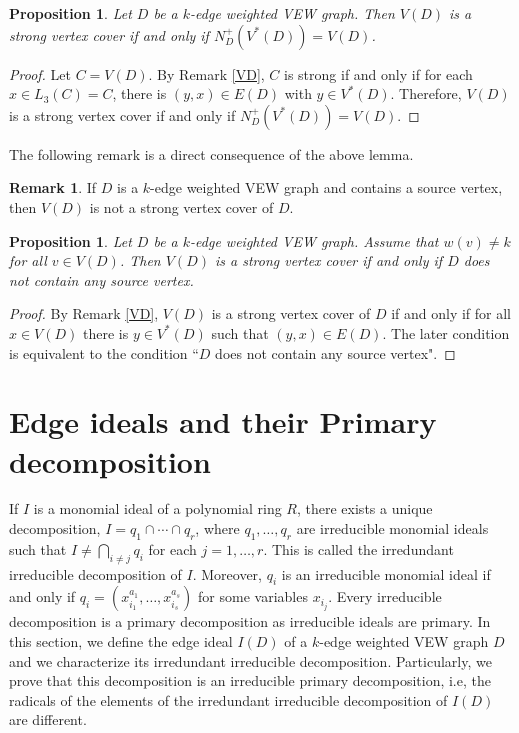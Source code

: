 \documentclass[11pt,reqno]{amsart}
\newtheorem{proposition}[theorem]{Proposition}
\theoremstyle{definition}
\newtheorem{remark}[theorem]{Remark}
\begin{document}
\begin{proposition}
	Let $ D $ be a $k$-edge weighted VEW graph. 
	Then $ V (D) $ is a strong vertex cover if
	and only if $ N_D^+(V^{*}(D)) = V(D) $. 	
\end{proposition}
\begin{proof}
	Let $ C = V (D). $ By Remark \ref{VD}, $ C $ is 
	strong  if and only if for each $ x \in L_3(C) = C $, there is $ (y,x) \in E(D) $ with $ y \in  V^{*}(D)$. Therefore, $ V (D) $ is a strong vertex
	cover if and only if $ N_D^+(V^{*}(D)) = V(D) $. 
\end{proof}


The following remark is a direct consequence of the above lemma.
\begin{remark}
If $ D $ is a $k$-edge weighted VEW graph  and contains a source vertex, then $ V (D) $    is not a strong vertex cover of $ D. $	
\end{remark}


\begin{proposition}
	Let $ D $ be a $k$-edge weighted VEW graph. Assume that
	$ w(v) \neq k $  for all $ v \in V(D) $.	Then $ V (D) $ is a strong vertex cover if and only if $D$ does not contain any source vertex. 	
\end{proposition}
 \begin{proof}
	By Remark \ref{VD}, $ V (D) $ is a strong vertex cover of $D$ if and only if for all $ x \in V (D) $ there is $ y \in V^*(D) $ such that $ (y,x) \in E(D). $ The later condition is equivalent to the condition ``$ D $ does not contain any source vertex".
 \end{proof}




\section{Edge ideals and their Primary decomposition}\label{sec4}


If $I$ is a monomial ideal of a polynomial ring $R$, there exists a  unique decomposition, $I=q_1 \cap \cdots \cap q_r$, where $q_1,\ldots,q_r$ are irreducible monomial ideals such that  $I \neq \bigcap_{i \neq j}q_i$  for each  $j=  1,\ldots,r$.   This is called the irredundant irreducible decomposition of $I$.  Moreover, $q_i$ is an irreducible monomial ideal if and only if $q_i= (x^{a_1}_{i_1},\ldots,x^{a_s}_{i_s})$ for some variables $x_{i_j}$.    Every irreducible decomposition is a primary decomposition as irreducible ideals are primary.  In this section, we define the edge ideal $I(D)$ of a $k$-edge weighted VEW graph $D$ and we characterize its irredundant irreducible decomposition.  Particularly, we prove that this decomposition is an irreducible primary decomposition, i.e, the radicals of the elements of the irredundant irreducible decomposition of $I(D)$ are different.
\end{document}
